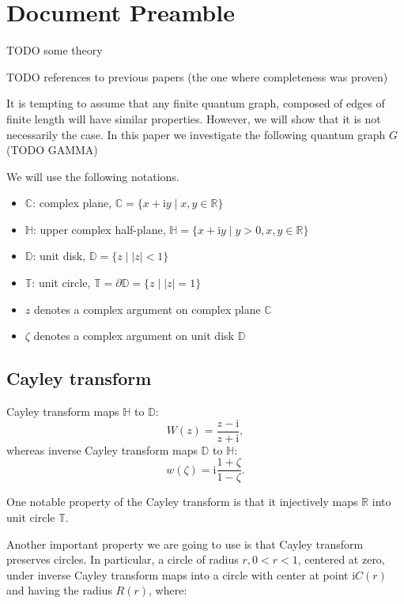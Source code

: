 \documentclass{birkjour}
\theoremstyle{definition}
\theoremstyle{remark}
\numberwithin{equation}{section}
\begin{document}
\section{Document Preamble}

TODO some theory

TODO references to previous papers (the one where completeness was proven)

It is tempting to assume that any finite quantum graph, composed of edges of finite length will have similar properties.
However, we will show that it is not necessarily the case. In this paper we investigate the following quantum graph $G$ (TODO GAMMA)

We will use the following notations.

\begin{itemize}
\item $\mathbb{C}$: complex plane, $\mathbb{C} = \{ x + \mathrm{i}
y \mid x, y \in \mathbb{R} \}$
\item $\mathbb{H}$: upper complex half-plane, $\mathbb{H} =
\{ x + \mathrm{i} y \mid y > 0, x, y \in \mathbb{R} \}$
\item $\mathbb{D}$: unit disk, $\mathbb{D} = \{ z \mid
\left|z\right| < 1 \}$
\item $\mathbb{T}$: unit circle, $\mathbb{T} = \partial \mathbb{D}
=  \{z \mid \left|z\right| = 1 \}$
\item $z$ denotes a complex argument on complex plane $\mathbb{C}$
\item $\zeta$ denotes a complex argument on unit disk $\mathbb{D}$
\end{itemize}

\subsection{Cayley transform}

Cayley transform maps $\mathbb{H}$ to $\mathbb{D}$:
\[
W(z) = \frac{z - \mathrm{i}}{z + \mathrm{i}},
\]
whereas inverse Cayley transform maps $\mathbb{D}$ to
$\mathbb{H}$:
\begin{equation}\label{eq:cayley_inverse}
w(\zeta) = \mathrm{i} \frac{1 + \zeta}{1 - \zeta}.
\end{equation}

One notable property of the Cayley transform  is that it
injectively maps $\mathbb{R}$ into unit circle $\mathbb{T}$.

Another important property  we are going to use is that Cayley
transform preserves circles. In particular, a circle of radius $r,
0 < r < 1$, centered at zero, under inverse Cayley transform maps
into a circle with center at point $\mathrm{i} C(r)$ and having
the radius $R(r)$, where:
\end{document}
